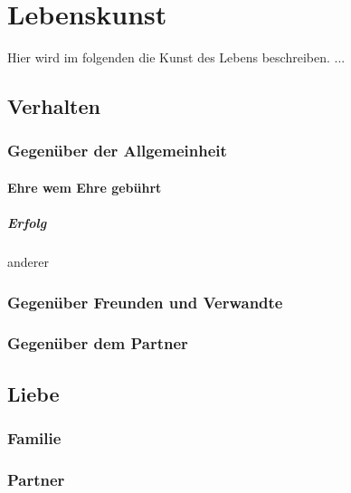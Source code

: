 \chapter{Lebenskunst} 
    \begin{thesis_quotation}
    \end{thesis_quotation}
    
    Hier wird im folgenden die Kunst des Lebens beschreiben. ...
      
    \section{Verhalten}
        \subsection{Gegenüber der Allgemeinheit}
            \subsubsection{Ehre wem Ehre gebührt}
                \paragraph{Erfolg}anderer
        \subsection{Gegenüber Freunden und Verwandte}        
        \subsection{Gegenüber dem Partner}
    \section{Liebe}
        \subsection{Familie}
        \subsection{Partner}
            
    
